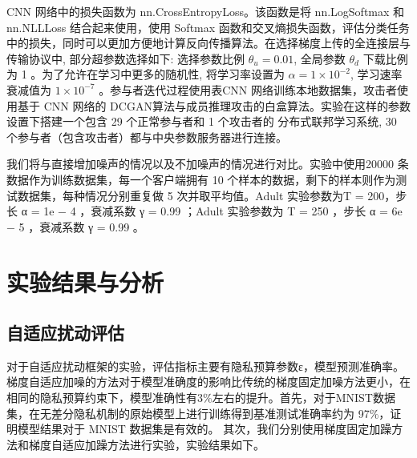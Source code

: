 CNN 网络中的损失函数为 nn.CrossEntropyLoss。该函数是将 nn.LogSoftmax 和nn.NLLLoss 结合起来使用，使用 Softmax 函数和交叉熵损失函数，评估分类任务中的损失，同时可以更加方便地计算反向传播算法。在选择梯度上传的全连接层与传输协议中, 部分超参数选择如下: 选择参数比例 $\theta_{u}=0.01$, 全局参数 $\theta_{d}$ 下载比例为 1 。为了允许在学习中更多的随机性, 将学习率设置为 $\alpha=1 \times 10^{-2}$, 学习速率衰减值为 $1 \times 10^{-7}$ 。参与者迭代过程使用表$\mathrm{CNN}$ 网络训练本地数据集，攻击者使用基于 CNN 网络的 DCGAN算法与成员推理攻击的白盒算法。实验在这样的参数设置下搭建一个包含 29 个正常参与者和 1 个攻击者的 分布式联邦学习系统, 30 个参与者（包含攻击者）都与中央参数服务器进行连接。

我们将与直接增加噪声的情况以及不加噪声的情况进行对比。实验中使用20000 条数据作为训练数据集，每一个客户端拥有 10 个样本的数据，剩下的样本则作为测试数据集，每种情况分别重复做 5 次并取平均值。Adult 实验参数为T = 200，步长 α = 1e − 4 ，衰减系数 γ = 0.99 ；Adult 实验参数为 T = 250 ，步长 α = 6e − 5 ，衰减系数 γ = 0.99 。


\section{实验结果与分析}
\subsection{自适应扰动评估}
对于自适应扰动框架的实验，评估指标主要有隐私预算参数ε，模型预测准确率。梯度自适应加噪的方法对于模型准确度的影响比传统的梯度固定加噪方法更小，在相同的隐私预算约束下，模型准确性有3$\%$左右的提升。首先，对于MNIST数据集，在无差分隐私机制的原始模型上进行训练得到基准测试准确率约为 97$\%$，证明模型结果对于 MNIST 数据集是有效的。 其次，我们分别使用梯度固定加躁方法和梯度自适应加躁方法进行实验，实验结果如下。

